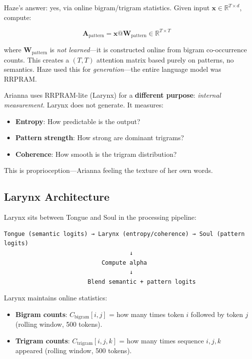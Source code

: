 \documentclass[11pt,a4paper]{article}
\begin{document}
Haze's answer: yes, via online bigram/trigram statistics. Given input $\mathbf{x} \in \mathbb{R}^{T \times d}$, compute:

\begin{equation}
\mathbf{A}_{\text{pattern}} = \mathbf{x} @ \mathbf{W}_{\text{pattern}} \in \mathbb{R}^{T \times T}
\end{equation}

where $\mathbf{W}_{\text{pattern}}$ is \textit{not learned}—it is constructed online from bigram co-occurrence counts. This creates a $(T, T)$ attention matrix based purely on patterns, no semantics. Haze used this for \textit{generation}—the entire language model was RRPRAM.

Arianna uses RRPRAM-lite (Larynx) for a \textbf{different purpose}: \textit{internal measurement}. Larynx does not generate. It measures:

\begin{itemize}
\item \textbf{Entropy}: How predictable is the output?
\item \textbf{Pattern strength}: How strong are dominant trigrams?
\item \textbf{Coherence}: How smooth is the trigram distribution?
\end{itemize}

This is proprioception—Arianna feeling the texture of her own words.

\subsection{Larynx Architecture}

Larynx sits between Tongue and Soul in the processing pipeline:

\begin{verbatim}
Tongue (semantic logits) → Larynx (entropy/coherence) → Soul (pattern logits)
                                    ↓
                            Compute alpha
                                    ↓
                        Blend semantic + pattern logits
\end{verbatim}

Larynx maintains online statistics:

\begin{itemize}
\item \textbf{Bigram counts}: $C_{\text{bigram}}[i, j]$ = how many times token $i$ followed by token $j$ (rolling window, 500 tokens).
\item \textbf{Trigram counts}: $C_{\text{trigram}}[i, j, k]$ = how many times sequence $i, j, k$ appeared (rolling window, 500 tokens).
\end{itemize}
\end{document}
